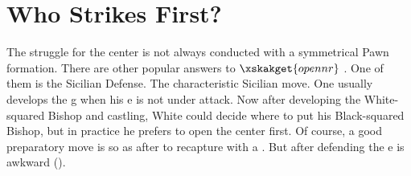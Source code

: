 

\chapter*{Who Strikes First?}










\newchessgame[id=main,white=Kupper,black=Tal,result=0--1,event=Zurich,date=1959]

%
The struggle for the center is not always conducted with a
symmetrical Pawn formation. There are other popular answers to
%
$\xskakget{opennr}$%
.
One of them is the Sicilian Defense.
%
%
The characteristic Sicilian move.
%
%
One usually develops the g when his e is not under attack.
%
%
%
%
Now after developing the White-squared Bishop and castling,
White could decide where to put his Black-squared Bishop, but in
practice he prefers to open the center first. Of course, a good
preparatory move is %
\newchessgame[newvar=main,id=variation]%
 so as after 
to recapture with a . But after 
defending the e is awkward ().

\resumechessgame[id=main,moveid=3w]

